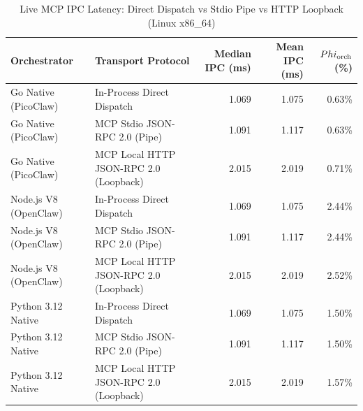 \begin{table}[t]
\centering\small
\caption{Live MCP IPC Latency: Direct Dispatch vs Stdio Pipe vs HTTP Loopback (Linux x86_64)}
\label{tab:linux_mcp_transport}
\begin{tabular}{llrrr}
\toprule
Orchestrator & Transport Protocol & Median IPC (ms) & Mean IPC (ms) & $\\Phi_{\text{orch}}$ (\%) \\
\midrule
Go Native (PicoClaw) & In-Process Direct Dispatch & 1.069 & 1.075 & 0.63\% \\
Go Native (PicoClaw) & MCP Stdio JSON-RPC 2.0 (Pipe) & 1.091 & 1.117 & 0.63\% \\
Go Native (PicoClaw) & MCP Local HTTP JSON-RPC 2.0 (Loopback) & 2.015 & 2.019 & 0.71\% \\
Node.js V8 (OpenClaw) & In-Process Direct Dispatch & 1.069 & 1.075 & 2.44\% \\
Node.js V8 (OpenClaw) & MCP Stdio JSON-RPC 2.0 (Pipe) & 1.091 & 1.117 & 2.44\% \\
Node.js V8 (OpenClaw) & MCP Local HTTP JSON-RPC 2.0 (Loopback) & 2.015 & 2.019 & 2.52\% \\
Python 3.12 Native & In-Process Direct Dispatch & 1.069 & 1.075 & 1.50\% \\
Python 3.12 Native & MCP Stdio JSON-RPC 2.0 (Pipe) & 1.091 & 1.117 & 1.50\% \\
Python 3.12 Native & MCP Local HTTP JSON-RPC 2.0 (Loopback) & 2.015 & 2.019 & 1.57\% \\
\bottomrule
\end{tabular}
\end{table}
